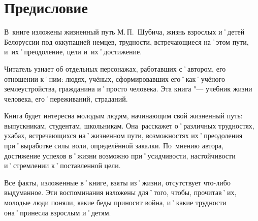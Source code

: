﻿\chapter{Предисловие}
В~книге изложены жизненный путь М.\,П.~Шубича, жизнь взрослых и˚детей Белоруссии под оккупацией немцев, трудности, встречающиеся на˚этом пути, и~их˚преодоление, цели и~их˚достижение.

Читатель узнает об отдельных персонажах, работавших с˚автором, его отношении к˚ним: людях, учёных, сформировавших его˚как˚учёного землеустройства, гражданина и˚просто человека. Эта книга "--- учебник жизни человека, его˚переживаний, страданий.

Книга будет интересна молодым людям, начинающим свой жизненный путь: выпускникам, студентам, школьникам. Она~расскажет о˚различных трудностях, ухабах, встречающихся на˚жизненном пути, возможностях их˚преодоления при˚выработке силы воли, определённой закалки. По~мнению автора, достижение успехов в˚жизни возможно при˚усидчивости, настойчивости и˚стремлении к˚поставленной цели.

Все факты, изложенные в˚книге, взяты из˚жизни, отсутствует что-либо выдуманное. Эти воспоминания изложены для˚того, чтобы, прочитав˚их, молодые люди поняли, какие беды приносит война, и˚какие трудности она˚принесла взрослым и˚детям.